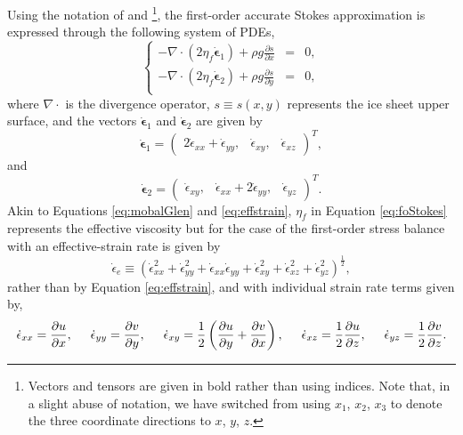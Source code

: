 Using the notation  of \cite{perego2012} and \citet{tezaur2015a}
\footnote{Vectors and tensors are given in bold rather than using indices.  Note that, in a slight abuse of notation, we have switched from using $x_1$, $x_2$, $x_3$ to denote the three coordinate directions to $x$, $y$, $z$.}, 
the first-order accurate Stokes approximation \citep[also referred to as the ``Blatter-Pattyn'' approximation, see][]{BLATTER1995,pattyn2003} is expressed through the following system of PDEs, 
\begin{equation} \label{eq:foStokes}
\left\{
\begin{array}{rcl} -\nabla \cdot (2 \eta_f \dot{\boldsymbol{\epsilon}}_1) + \rho g
\frac{\partial s}{\partial x}&=&0, \\
-\nabla \cdot (2 \eta_f \dot{\boldsymbol{\epsilon}}_2) +\rho g
\frac{\partial s}{\partial y} &=& 0, \\
\end{array}\right.
\end{equation}
where $\nabla \cdot $ is the divergence operator, $s\equiv s(x,y)$ represents the ice sheet upper surface, and the vectors $\dot{\boldsymbol{\epsilon}}_1$ and $\dot{\boldsymbol{\epsilon}}_2$ are given by 
\begin{equation}
\dot{\boldsymbol{\epsilon}}_1 = \left(\begin{array}{ccc}
2\dot{\epsilon}_{xx} + \dot{\epsilon}_{yy}, &\dot{\epsilon}_{xy},&
\dot{\epsilon}_{xz}\end{array}\right)^T,
\end{equation}
and
\begin{equation}
\dot{\boldsymbol{\epsilon}}_2 = \left(
\begin{array}{ccc}\dot{\epsilon}_{xy}, &
\dot{\epsilon}_{xx} + 2\dot{\epsilon}_{yy}, &\dot{\epsilon}_{yz}
\end{array}\right)^T.
\end{equation}
Akin to Equations \ref{eq:mobalGlen} and \ref{eq:effstrain}, $\eta_f$ in Equation \ref{eq:foStokes} represents the effective viscosity but for the case of the first-order stress balance with an effective-strain rate is given by
\begin{equation} \label{eq:effStrain2}
\dot{\epsilon}_e \equiv \left( \dot{\epsilon}_{xx}^2 +
\dot{\epsilon}_{yy}^2 + \dot{\epsilon}_{xx} \dot{\epsilon}_{yy} +
\dot{\epsilon}_{xy}^2 + \dot{\epsilon}_{xz}^2 +
\dot{\epsilon}_{yz}^2 \right)^\frac{1}{2},
\end{equation}
rather than by Equation \ref{eq:effstrain}, and with individual strain rate terms given by,
\begin{equation} \label{eq:epsilonij}
\dot{\epsilon}_{xx} = \frac{\partial u}{\partial x}, \hspace{0.5cm} 
\dot{\epsilon}_{yy} = \frac{\partial v}{\partial y}, \hspace{0.5cm}
\dot{\epsilon}_{xy} = \frac{1}{2}\left(\frac{\partial u}{\partial y} + \frac{\partial v}{\partial x} \right), \hspace{0.5cm}
\dot{\epsilon}_{xz} = \frac{1}{2} \frac{\partial u}{\partial z}, \hspace{0.5cm} 
\dot{\epsilon}_{yz} = \frac{1}{2} \frac{\partial v}{\partial z}.
\end{equation}

